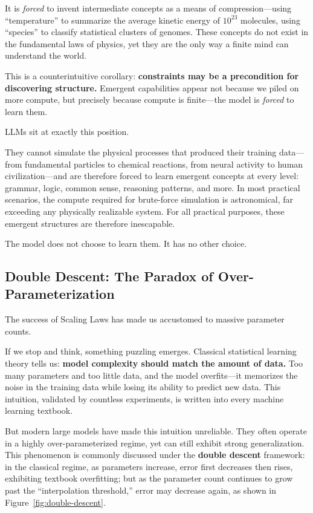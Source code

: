 It is \textit{forced} to invent intermediate concepts as a means of compression---using ``temperature'' to summarize the average kinetic energy of $10^{23}$ molecules, using ``species'' to classify statistical clusters of genomes. These concepts do not exist in the fundamental laws of physics, yet they are the only way a finite mind can understand the world.

\vspace{1em}

This is a counterintuitive corollary: \textbf{constraints may be a precondition for discovering structure.}
Emergent capabilities appear not because we piled on more compute, but precisely because compute is finite---the model is \textit{forced} to learn them.

\vspace{1em}

LLMs sit at exactly this position.

They cannot simulate the physical processes that produced their training data---from fundamental particles to chemical reactions, from neural activity to human civilization---and are therefore forced to learn emergent concepts at every level: grammar, logic, common sense, reasoning patterns, and more. In most practical scenarios, the compute required for brute-force simulation is astronomical, far exceeding any physically realizable system.
For all practical purposes, these emergent structures are therefore inescapable.

The model does not choose to learn them. It has no other choice.

\subsection{Double Descent: The Paradox of Over-Parameterization}

The success of Scaling Laws has made us accustomed to massive parameter counts.

If we stop and think, something puzzling emerges.
Classical statistical learning theory tells us: \textbf{model complexity should match the amount of data.}
Too many parameters and too little data, and the model overfits---it memorizes the noise in the training data while losing its ability to predict new data.
This intuition, validated by countless experiments, is written into every machine learning textbook.

But modern large models have made this intuition unreliable. They often operate in a highly over-parameterized regime, yet can still exhibit strong generalization. This phenomenon is commonly discussed under the \textbf{double descent} framework: in the classical regime, as parameters increase, error first decreases then rises, exhibiting textbook overfitting; but as the parameter count continues to grow past the ``interpolation threshold,'' error may decrease again, as shown in Figure~\ref{fig:double-descent}.

